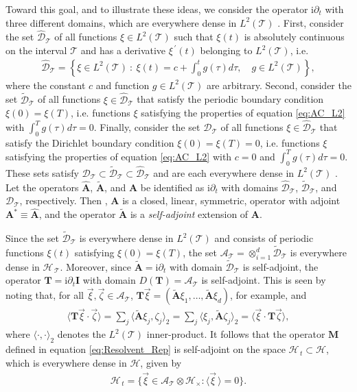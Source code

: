 \documentclass[11pt]{amsart}
\newcommand{\I}{\mathrm{i}}
\newcommand{\Mb}{\mathbf{M}}
\newcommand{\Tb}{\mathbf{T}}
\newcommand{\Ib}{\mathbf{I}}
\newcommand{\Ab}{\mathbf{A}}
\newcommand{\Tc}{\mathcal{T}}
\newcommand{\Hs}{\mathscr{H}}
\newcommand{\As}{\mathscr{A}}
\newcommand{\Ds}{\mathscr{D}}
\begin{document}
Toward this goal, and to illustrate these ideas, we consider the
operator $\I\partial_t$ with three different domains, which are everywhere
dense in $L^2(\Tc)$ \cite{Stone:64}. First, consider the set
$\hat{\Ds}_{\Tc}$ of all functions $\xi\in L^2(\Tc)$ such that $\xi(t)$ is
absolutely continuous \cite{Royden:1988:RA} on the interval $\Tc$ and
has a derivative $\xi^{\,\prime}(t)$ belonging to $L^2(\Tc)$,
i.e. \cite{Stone:64,Royden:1988:RA}  
%
\begin{align}\label{eq:AC_L2}
  \hat{\Ds}_{\Tc}=\left\{
       \xi\in L^2(\Tc) \ : \ \xi(t)=c+\int_0^tg(\tau)d\tau, \quad  g\in L^2(\Tc)
       \right\},
\end{align}
%
where the constant $c$ and function $g\in L^2(\Tc)$ are
arbitrary. Second, consider the set $\tilde{\Ds}_{\Tc}$ of all
functions $\xi\in\hat{\Ds}_{\Tc}$ that satisfy the periodic boundary
condition $\xi(0)=\xi(T)$, i.e. functions $\xi$ satisfying the properties of
equation \eqref{eq:AC_L2} with $\int_0^Tg(\tau)d\tau=0$. Finally, consider the
set $\Ds_{\Tc}$ of all functions $\xi\in\hat{\Ds}_{\Tc}$ that satisfy the
Dirichlet boundary condition $\xi(0)=\xi(T)=0$, i.e. functions $\xi$
satisfying the properties of equation \eqref{eq:AC_L2} with $c=0$ and
$\int_0^Tg(\tau)d\tau=0$. These sets satisfy
$\Ds_{\Tc}\subset\tilde{\Ds}_{\Tc}\subset\hat{\Ds}_{\Tc}$ and are each everywhere
dense in $L^2(\Tc)$ \cite{Stone:64}. Let the operators $\hat{\Ab}$,
$\tilde{\Ab}$, and $\Ab$ be identified as $\I\partial_t$ with domains
$\hat{\Ds}_{\Tc}$, $\tilde{\Ds}_{\Tc}$, and $\Ds_{\Tc}$,
respectively. Then \cite{Stone:64}, $\Ab$ is a closed, linear,
symmetric, operator with adjoint $\Ab^*\equiv\hat{\Ab}$, and the operator
$\tilde{\Ab}$ is a \emph{self-adjoint} extension of $\Ab$. 



Since the set $\tilde{\Ds}_{\Tc}$ is everywhere dense in $L^2(\Tc)$
and consists of periodic functions $\xi(t)$ satisfying $\xi(0)=\xi(T)$,
the set $\As_{\Tc}=\otimes_{i=1}^d\tilde{\Ds}_{\Tc}$ is everywhere dense in
$\Hs_{\,\Tc}$. Moreover, since $\tilde{\Ab}=\I\partial_t$ with domain
$\tilde{\Ds}_{\Tc}$ is self-adjoint, the operator $\Tb=\I\partial_t\Ib$ with
domain $D(\Tb)=\As_{\Tc}$ is self-adjoint. This is seen by noting
that, for all $\vec{\xi},\vec{\zeta}\in\As_{\Tc}$,
$\Tb\vec{\xi}=(\tilde{\Ab}\xi_1,\ldots,\tilde{\Ab}\xi_d)$, for example, and  
%
\begin{align}
  \langle\Tb\vec{\xi}\cdot\vec{\zeta}\rangle=\sum_j\langle\tilde{\Ab}\xi_j,\zeta_j\rangle_2
                    =\sum_j\langle\xi_j,\tilde{\Ab}\zeta_j\rangle_2
                    =\langle\vec{\xi}\cdot\Tb\vec{\zeta}\rangle,
\end{align}
%
where $\langle\cdot,\cdot\rangle_2$ denotes the $L^2(\Tc)$ inner-product.
It follows that the operator $\Mb$ defined in equation
\eqref{eq:Resolvent_Rep} is self-adjoint on the space $\Hs_{\,t}\subset\Hs$,
which is everywhere dense in $\Hs$, given by
%
\begin{align}\label{eq:Ht}
  \Hs_{\,t}=\{\vec{\xi}\in\As_{\Tc}\otimes\Hs_\times: \langle\vec{\xi}\,\rangle=0\}.
\end{align}
%
\end{document}
